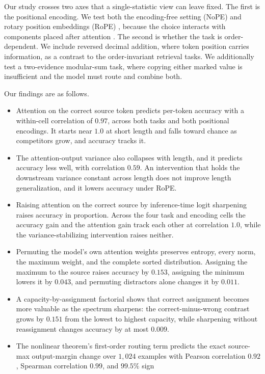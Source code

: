 \documentclass[letterpaper]{article} %
\begin{document}
Our study crosses two axes that a single-statistic view can leave fixed.
The first is the positional encoding.
We test both the encoding-free setting (NoPE) \citep{kazemnejad} and rotary position embeddings (RoPE)
\citep{rope}, because the choice interacts with components placed after attention \citep{fope,postnorm}.
The second is whether the task is order-dependent.
We include reversed decimal addition, where token position carries information, as a contrast to the
order-invariant retrieval tasks.
We additionally test a two-evidence modular-sum task, where copying either marked value is insufficient and
the model must route and combine both.

Our findings are as follows.

\begin{itemize}
\item Attention on the correct source token predicts per-token accuracy with a within-cell correlation of
$0.97$, across both tasks and both positional encodings. It starts near $1.0$ at short length and falls
toward chance as competitors grow, and accuracy tracks it.
\item The attention-output variance also collapses with length, and it predicts accuracy less well, with
correlation $0.59$. An intervention that holds the downstream variance constant across length does not
improve length generalization, and it lowers accuracy under RoPE.
\item Raising attention on the correct source by inference-time logit sharpening raises accuracy in
proportion. Across the four task and encoding cells the accuracy gain and the attention gain track each
other at correlation $1.0$, while the variance-stabilizing intervention raises neither.
\item Permuting the model's own attention weights preserves entropy, every norm, the maximum weight, and
the complete sorted distribution. Assigning the maximum to the source raises accuracy by $0.153$, assigning
the minimum lowers it by $0.043$, and permuting distractors alone changes it by $0.011$.
\item A capacity-by-assignment factorial shows that correct assignment becomes more valuable as the
spectrum sharpens: the correct-minus-wrong contrast grows by $0.151$ from the lowest to highest capacity,
while sharpening without reassignment changes accuracy by at most $0.009$.
\item The nonlinear theorem's first-order routing term predicts the exact source-max output-margin change
over $1{,}024$ examples with Pearson correlation $0.92$, Spearman correlation $0.99$, and $99.5\%$ sign

\end{itemize}
\end{document}
